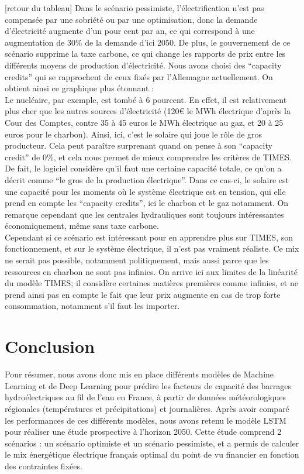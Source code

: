 \documentclass{article}
\theoremstyle{nopointbreak}
\theoremstyle{nobrkbold}
\begin{document}
[retour du tableau]
Dans le scénario pessimiste, l'électrification n’est pas compensée par une sobriété ou par une optimisation, donc la demande d'électricité augmente d’un pour cent par an, ce qui correspond à une augmentation de 30\% de la demande d’ici 2050. 
De plus, le gouvernement de ce scénario supprime la taxe carbone, ce qui change les rapports de prix entre les différents moyens de production d’électricité. 
Nous avons choisi des “capacity credits” qui se rapprochent de ceux fixés par l'Allemagne actuellement. On obtient ainsi ce graphique plus étonnant : \\
[graphe]
Le nucléaire, par exemple, est tombé à 6 pourcent. En effet, il est relativement plus cher que les autres sources d’électricité (120€ le MWh électrique d’après la Cour des Comptes, contre 35 à 45 euros le MWh électrique au gaz, et 20 à 25 euros pour le charbon).
Ainsi, ici, c’est le solaire qui joue le rôle de gros producteur. Cela peut paraître surprenant quand on pense à son “capacity credit” de 0\%, et cela nous permet de mieux comprendre les critères de TIMES. \\
De fait, le logiciel considère qu’il faut une certaine capacité totale, ce qu’on a décrit comme “le gros de la production électrique”. Dans ce cas-ci, le solaire est une capacité pour les moments où le système électrique est en tension, qui elle prend en compte les “capacity credits”, ici le charbon et le gaz notamment. 
On remarque cependant que les centrales hydrauliques sont toujours intéressantes économiquement, même sans taxe carbone. \\
Cependant si ce scénario est intéressant pour en apprendre plus sur TIMES, son fonctionnement, et sur le système électrique, il n’est pas vraiment réaliste. Ce mix ne serait pas possible, notamment politiquement, mais aussi parce que les ressources en charbon ne sont pas infinies. 
On arrive ici aux limites de la linéarité du modèle TIMES; il considère certaines matières premières comme infinies, et ne prend ainsi pas en compte le fait que leur prix augmente en cas de trop forte consommation, notamment s’il faut les importer. \\


\newpage
\section{Conclusion}
Pour résumer, nous avons donc mis en place différents modèles de Machine Learning et de Deep Learning 
pour prédire les facteurs de capacité des barrages hydroélectriques au fil de l'eau en France, 
à partir de données météorologiques régionales (températures et précipitations) et journalières. 
Après avoir comparé les performances de ces différents modèles, nous avons retenu le modèle LSTM 
pour réaliser une étude prospective à l'horizon 2050. Cette étude comprend 2 scénarios : 
un scénario optimiste et un scénario pessimiste, et a permis de calculer le mix énergétique 
électrique français optimal du point de vu financier en fonction des contraintes fixées.\\
\end{document}

